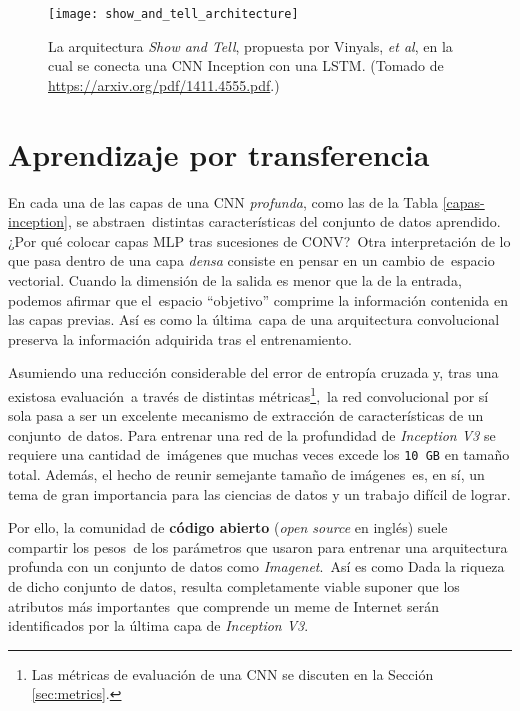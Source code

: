 \begin{figure}[H]
  \centering
  \texttt{[image: show\_and\_tell\_architecture]}
  \caption{La arquitectura \emph{Show and Tell}, propuesta por Vinyals, \emph{et al},\cite{DBLP:journals/corr/VinyalsTBE14}
    en la cual se conecta una CNN Inception con una LSTM.
    (Tomado de \url{https://arxiv.org/pdf/1411.4555.pdf}.)}
  \label{show_and_tell_architecture}
\end{figure}

\section{Aprendizaje por transferencia}

\noindent
En cada una de las capas de una CNN \emph{profunda}, como las de la Tabla \ref{capas-inception}, se abstraen\
distintas características del conjunto de datos aprendido. ¿Por qué colocar capas MLP tras sucesiones de CONV?\
Otra interpretación de lo que pasa dentro de una capa \emph{densa} consiste en pensar en un cambio de\
espacio vectorial. Cuando la dimensión de la salida es menor que la de la entrada, podemos afirmar que el\
espacio ``objetivo'' comprime la información contenida en las capas previas. Así es como la última\
capa de una arquitectura convolucional preserva la información adquirida tras el entrenamiento.\par
Asumiendo una reducción considerable del error de entropía cruzada y, tras una existosa evaluación\
a través de distintas métricas\footnote{
  Las métricas de evaluación de una CNN se discuten en la Sección \ref{sec:metrics}.
},\
la red convolucional por sí sola pasa a ser un excelente mecanismo de extracción de características de un conjunto\
de datos. Para entrenar una red de la profundidad de \emph{Inception V3} se requiere una cantidad de\
imágenes que muchas veces excede los \verb+10 GB+ en tamaño total. Además, el hecho de reunir semejante tamaño de imágenes\
es, en sí, un tema de gran importancia para las ciencias de datos y un trabajo difícil de lograr.\par
Por ello, la comunidad de \textbf{código abierto} (\emph{open source} en inglés) suele compartir los pesos\
de los parámetros que usaron para entrenar una arquitectura profunda con un conjunto de datos como \emph{Imagenet}.\
Así es como
Dada la riqueza de dicho conjunto de datos, resulta completamente viable suponer que los atributos más importantes\
que comprende un meme de Internet serán identificados por la última capa de \emph{Inception V3}.\par
